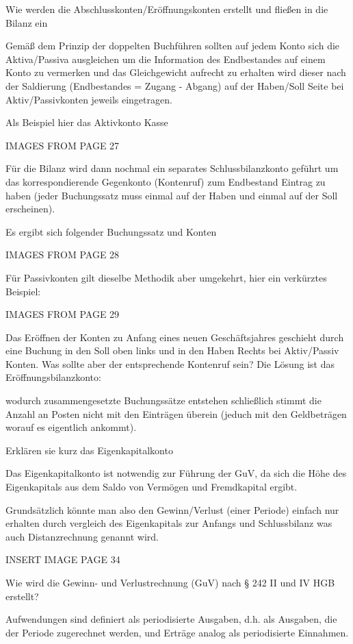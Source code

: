 Wie werden die Abschlusskonten/Eröffnungskonten erstellt und fließen in die Bilanz ein

Gemäß dem Prinzip der doppelten Buchführen sollten auf jedem Konto sich die Aktiva/Passiva ausgleichen 
um die Information des Endbestandes auf einem Konto zu vermerken  und das Gleichgewicht aufrecht zu erhalten 
wird dieser nach der Saldierung (Endbestandes = Zugang - Abgang) auf der Haben/Soll Seite bei Aktiv/Passivkonten
jeweils eingetragen.

Als Beispiel hier das Aktivkonto Kasse

IMAGES FROM PAGE 27

Für die Bilanz wird dann nochmal ein separates Schlussbilanzkonto geführt um das korrespondierende 
Gegenkonto (Kontenruf) zum Endbestand Eintrag zu haben (jeder Buchungssatz muss einmal auf der Haben und einmal auf der Soll
erscheinen).

Es ergibt sich folgender Buchungssatz und Konten


IMAGES FROM PAGE 28

Für Passivkonten gilt dieselbe Methodik aber umgekehrt, hier ein verkürztes Beispiel:

IMAGES FROM PAGE 29

Das Eröffnen der Konten zu Anfang eines neuen Geschäftsjahres geschieht durch eine Buchung
in den Soll oben links und in den Haben Rechts bei Aktiv/Passiv Konten. Was sollte aber der
entsprechende Kontenruf sein? Die Lösung ist das Eröffnungsbilanzkonto:


wodurch zusammengesetzte Buchungssätze entstehen schließlich stimmt die Anzahl an Posten nicht mit den Einträgen
überein (jeduch mit den Geldbeträgen worauf es eigentlich ankommt).


Erklären sie kurz das Eigenkapitalkonto 

Das Eigenkapitalkonto ist notwendig zur Führung der GuV, da sich
die Höhe des Eigenkapitals aus dem Saldo von Vermögen und Fremdkapital ergibt.

Grundsätzlich könnte man also den Gewinn/Verlust (einer Periode) einfach nur erhalten
durch vergleich des Eigenkapitals zur Anfangs und Schlussbilanz was auch Distanzrechnung genannt wird.

INSERT IMAGE PAGE 34


Wie wird die Gewinn- und Verlustrechnung (GuV) nach § 242 II und IV HGB erstellt?

Aufwendungen sind definiert als periodisierte Ausgaben, d.h. als Ausgaben, die
der Periode zugerechnet werden, und Erträge analog als periodisierte Einnahmen.


